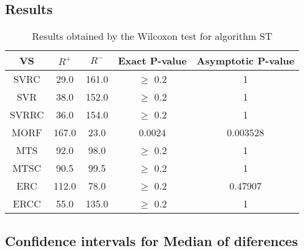 \documentclass[a4paper,10pt]{article}
\begin{document}
\subsection{Results}

\begin{table}[!htp]
\centering\small
\begin{tabular}{
|c|c|c|c|c|}
\hline
 VS & $R^{+}$ & $R^{-}$ & Exact P-value & Asymptotic P-value \\ \hline 
SVRC & 29.0 & 161.0 & $\geq$ 0.2 & 1\\ \hline 
SVR & 38.0 & 152.0 & $\geq$ 0.2 & 1\\ \hline 
SVRRC & 36.0 & 154.0 & $\geq$ 0.2 & 1\\ \hline 
MORF & 167.0 & 23.0 & 0.0024 & 0.003528\\ \hline 
MTS & 92.0 & 98.0 & $\geq$ 0.2 & 1\\ \hline 
MTSC & 90.5 & 99.5 & $\geq$ 0.2 & 1\\ \hline 
ERC & 112.0 & 78.0 & $\geq$ 0.2 & 0.47907\\ \hline 
ERCC & 55.0 & 135.0 & $\geq$ 0.2 & 1\\ \hline 

\end{tabular}
\caption{Results obtained by the Wilcoxon test for algorithm ST}
\end{table}

\subsection{Confidence intervals for Median of diferences}
\end{document}
